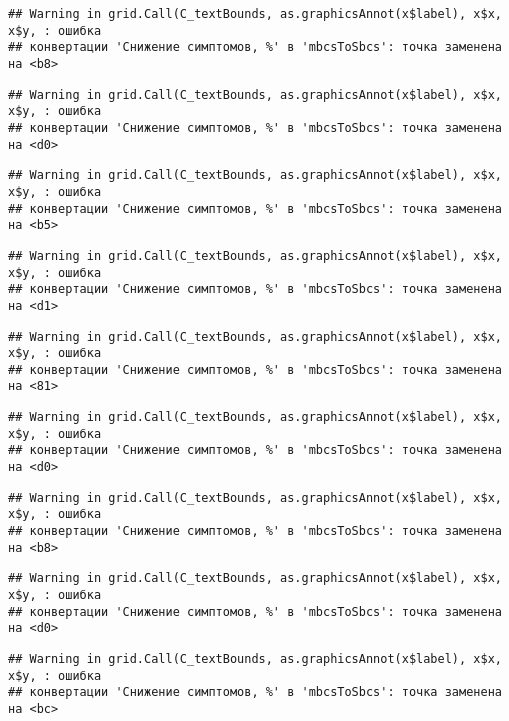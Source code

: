 \documentclass[
]{article}
\begin{document}
\begin{verbatim}
## Warning in grid.Call(C_textBounds, as.graphicsAnnot(x$label), x$x, x$y, : ошибка
## конвертации 'Снижение симптомов, %' в 'mbcsToSbcs': точка заменена на <b8>
\end{verbatim}

\begin{verbatim}
## Warning in grid.Call(C_textBounds, as.graphicsAnnot(x$label), x$x, x$y, : ошибка
## конвертации 'Снижение симптомов, %' в 'mbcsToSbcs': точка заменена на <d0>
\end{verbatim}

\begin{verbatim}
## Warning in grid.Call(C_textBounds, as.graphicsAnnot(x$label), x$x, x$y, : ошибка
## конвертации 'Снижение симптомов, %' в 'mbcsToSbcs': точка заменена на <b5>
\end{verbatim}

\begin{verbatim}
## Warning in grid.Call(C_textBounds, as.graphicsAnnot(x$label), x$x, x$y, : ошибка
## конвертации 'Снижение симптомов, %' в 'mbcsToSbcs': точка заменена на <d1>
\end{verbatim}

\begin{verbatim}
## Warning in grid.Call(C_textBounds, as.graphicsAnnot(x$label), x$x, x$y, : ошибка
## конвертации 'Снижение симптомов, %' в 'mbcsToSbcs': точка заменена на <81>
\end{verbatim}

\begin{verbatim}
## Warning in grid.Call(C_textBounds, as.graphicsAnnot(x$label), x$x, x$y, : ошибка
## конвертации 'Снижение симптомов, %' в 'mbcsToSbcs': точка заменена на <d0>
\end{verbatim}

\begin{verbatim}
## Warning in grid.Call(C_textBounds, as.graphicsAnnot(x$label), x$x, x$y, : ошибка
## конвертации 'Снижение симптомов, %' в 'mbcsToSbcs': точка заменена на <b8>
\end{verbatim}

\begin{verbatim}
## Warning in grid.Call(C_textBounds, as.graphicsAnnot(x$label), x$x, x$y, : ошибка
## конвертации 'Снижение симптомов, %' в 'mbcsToSbcs': точка заменена на <d0>
\end{verbatim}

\begin{verbatim}
## Warning in grid.Call(C_textBounds, as.graphicsAnnot(x$label), x$x, x$y, : ошибка
## конвертации 'Снижение симптомов, %' в 'mbcsToSbcs': точка заменена на <bc>
\end{verbatim}
\end{document}
